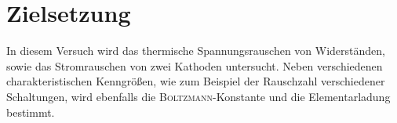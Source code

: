 \section{Zielsetzung}
\label{sec:zielsetzung}

In diesem Versuch wird das thermische Spannungsrauschen von Widerständen, sowie
das Stromrauschen von zwei Kathoden untersucht. Neben verschiedenen
charakteristischen Kenngrößen, wie zum Beispiel der Rauschzahl verschiedener Schaltungen, wird ebenfalls die \textsc{Boltzmann}-Konstante und die Elementarladung
bestimmt.
